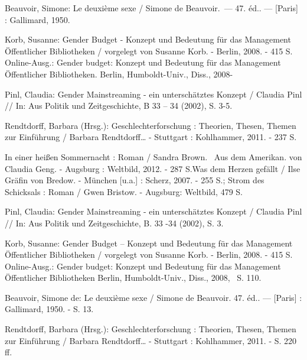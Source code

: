 \documentclass[a4paper,
fontsize=11pt,
oneside,
numbers=noperiodatend,
parskip=half-,
bibliography=totoc,
final
]{scrartcl}
\begin{document}
Beauvoir, Simone: Le deuxième sexe / Simone de Beauvoir.~--- 47. éd..
--- {[}Paris{]} : Gallimard, 1950.

Korb, Susanne: Gender Budget - Konzept und Bedeutung für das Management
Öffentlicher Bibliotheken / vorgelegt von Susanne Korb. - Berlin, 2008.
- 415 S. Online-Ausg.: Gender budget: Konzept und Bedeutung für das
Management Öffentlicher Bibliotheken. Berlin, Humboldt-Univ., Diss.,
2008-

Pinl, Claudia: Gender Mainstreaming - ein unterschätztes Konzept /
Claudia Pinl // In: Aus Politik und Zeitgeschichte, B 33 -- 34 (2002),
S. 3-5.

Rendtdorff, Barbara (Hrsg.): Geschlechterforschung : Theorien, Thesen,
Themen zur Einführung / Barbara Rendtdorff\ldots{} - Stuttgart :
Kohlhammer, 2011. - 237 S.

In einer heißen Sommernacht : Roman / Sandra Brown.~ Aus dem Amerikan.
von Claudia Geng. - Augsburg : Weltbild, 2012. - 287 S.Was dem Herzen
gefällt / Ilse Gräfin von Bredow. - München {[}u.a.{]} : Scherz, 2007. -
255 S.; Strom des Schicksals : Roman / Gwen Bristow. - Augsburg:
Weltbild, 479 S.

Pinl, Claudia: Gender Mainstreaming - ein unterschätztes Konzept /
Claudia Pinl // In: Aus Politik und Zeitgeschichte, B. 33 -34 (2002), S.
3.

Korb, Susanne: Gender Budget -- Konzept und Bedeutung für das Management
Öffentlicher Bibliotheken / vorgelegt von Susanne Korb. - Berlin, 2008.
- 415 S. Online-Ausg.: Gender budget: Konzept und Bedeutung für das
Management Öffentlicher Bibliotheken Berlin, Humboldt-Univ., Diss.,
2008,~ S. 110.

Beauvoir, Simone de: Le deuxième sexe / Simone de Beauvoir. 47. éd.. ---
{[}Paris{]} : Gallimard, 1950. - S. 13.

Rendtdorff, Barbara (Hrsg.): Geschlechterforschung : Theorien, Thesen,
Themen zur Einführung / Barbara Rendtdorff\ldots{} - Stuttgart :
Kohlhammer, 2011. - S. 220 ff.

\end{document}
